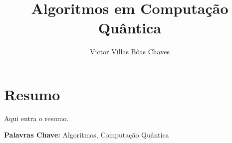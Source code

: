 \documentclass{imetex-inci}
\author{Victor Villas Bôas Chaves}
\title{Algoritmos em Computação Quântica}
\date{\the\year}
\begin{document}
 
\printFrontMatter

\chapter*{Resumo}
Aqui entra o resumo.

\textbf{Palavras Chave:} Algoritmos, Computação Quântica


\printBackMatter

\end{document}
